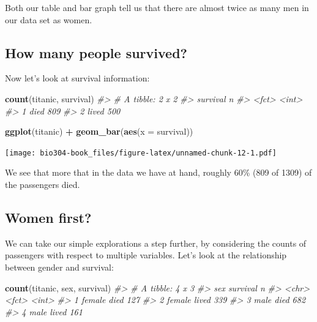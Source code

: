 \documentclass[]{book}
\newenvironment{Shaded}{\begin{snugshade}}{\end{snugshade}}
\newcommand{\CommentTok}[1]{\textcolor[rgb]{0.56,0.35,0.01}{\textit{#1}}}
\newcommand{\DataTypeTok}[1]{\textcolor[rgb]{0.13,0.29,0.53}{#1}}
\newcommand{\KeywordTok}[1]{\textcolor[rgb]{0.13,0.29,0.53}{\textbf{#1}}}
\newcommand{\NormalTok}[1]{#1}
\newcommand{\OperatorTok}[1]{\textcolor[rgb]{0.81,0.36,0.00}{\textbf{#1}}}
\newcommand{\StringTok}[1]{\textcolor[rgb]{0.31,0.60,0.02}{#1}}
\theoremstyle{definition}
\theoremstyle{definition}
\theoremstyle{definition}
\theoremstyle{remark}
\begin{document}
Both our table and bar graph tell us that there are almost twice as many
men in our data set as women.

\hypertarget{how-many-people-survived}{%
\subsection{How many people survived?}\label{how-many-people-survived}}

Now let's look at survival information:

\begin{Shaded}
\begin{Highlighting}[]
\KeywordTok{count}\NormalTok{(titanic, survival)}
\CommentTok{#> # A tibble: 2 x 2}
\CommentTok{#>   survival     n}
\CommentTok{#>   <fct>    <int>}
\CommentTok{#> 1 died       809}
\CommentTok{#> 2 lived      500}
\end{Highlighting}
\end{Shaded}

\begin{Shaded}
\begin{Highlighting}[]
\KeywordTok{ggplot}\NormalTok{(titanic) }\OperatorTok{+}\StringTok{ }
\StringTok{  }\KeywordTok{geom_bar}\NormalTok{(}\KeywordTok{aes}\NormalTok{(}\DataTypeTok{x =}\NormalTok{ survival))}
\end{Highlighting}
\end{Shaded}

\texttt{[image: bio304-book\_files/figure-latex/unnamed-chunk-12-1.pdf]}

We see that more that in the data we have at hand, roughly 60\% (809 of
1309) of the passengers died.

\hypertarget{women-first}{%
\subsection{Women first?}\label{women-first}}

We can take our simple explorations a step further, by considering the
counts of passengers with respect to multiple variables. Let's look at
the relationship between gender and survival:

\begin{Shaded}
\begin{Highlighting}[]
\KeywordTok{count}\NormalTok{(titanic, sex, survival) }
\CommentTok{#> # A tibble: 4 x 3}
\CommentTok{#>   sex    survival     n}
\CommentTok{#>   <chr>  <fct>    <int>}
\CommentTok{#> 1 female died       127}
\CommentTok{#> 2 female lived      339}
\CommentTok{#> 3 male   died       682}
\CommentTok{#> 4 male   lived      161}
\end{Highlighting}
\end{Shaded}
\end{document}
